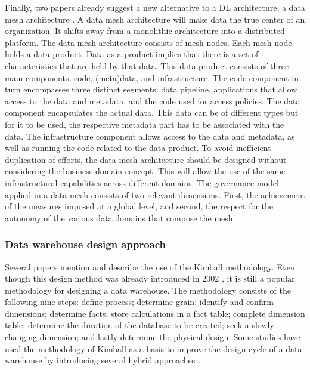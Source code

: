 \documentclass[11pt]{article}
\begin{document}
Finally, two papers already suggest a new alternative to a DL architecture, a data mesh architecture \cite{Vlasiuk2023183, Machado2021263}. A data mesh architecture will make data the true center of an organization. It shifts away from a monolithic architecture into a distributed platform. The data mesh architecture consists of mesh nodes. Each mesh node holds a data product. Data as a product implies that there is a set of characteristics that are held by that data. This data product consists of three main components, code, (meta)data, and infrastructure. The code component in turn encompasses three distinct segments: data pipeline, applications that allow access to the data and metadata, and the code used for access policies. The data component encapsulates the actual data. This data can be of different types but for it to be used, the respective metadata part has to be associated with the data. The infrastructure component allows access to the data and metadata, as well as running the code related to the data product. To avoid inefficient duplication of efforts, the data mesh architecture should be designed without considering the business domain concept. This will allow the use of the same infrastructural capabilities across different domains. The governance model applied in a data mesh consists of two relevant dimensions. First, the achievement of the measures imposed at a global level, and second, the respect for the autonomy of the various data domains that compose the mesh. \\

\subsubsection{Data warehouse design approach}
Several papers \cite{Ramadhani202188, Himami2021146, Wahyudi2019, Rahutomo2018128} mention and describe the use of the Kimball methodology. Even though this design method was already introduced in 2002 \cite{kimball2011data}, it is still a popular methodology for designing a data warehouse. The methodology consists of the following nine steps: define process; determine grain; identify and confirm dimensions; determine facts; store calculations in a fact table; complete dimension table; determine the duration of the database to be created; seek a slowly changing dimension; and lastly determine the physical design. Some studies have used the methodology of Kimball as a basis to improve the design cycle of a data warehouse by introducing several hybrid approaches \cite{Takács20201}. \\
\end{document}

